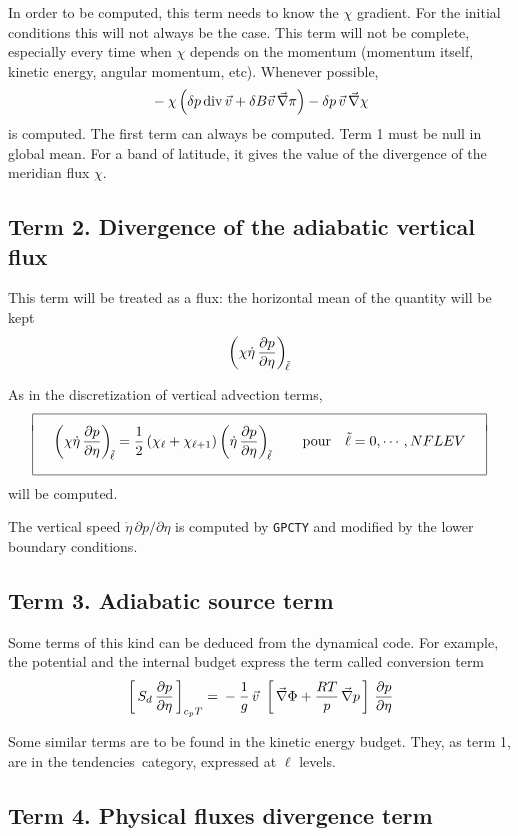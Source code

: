 In order to be computed, this term needs to know the $\chi$ gradient. For the initial conditions this will not always be the case. This term will not be complete, especially every time when $\chi$ depends on the momentum (momentum itself, kinetic energy, angular momentum, etc). Whenever possible, 
$$ \mb - \chi \lp \delta p \div \vec v + \delta B \vec v\, \grad\pi \rp - \delta p \,\vec v \,\grad 
\chi $$
is computed. The first term can always be computed.
Term 1 must be null in global mean. For a band of latitude, it gives the value of the divergence of the meridian flux $\chi$.

\subsection{Term 2. Divergence of the adiabatic vertical flux}

This term will be treated as a flux: the horizontal mean of the quantity will be kept
$$ \lp \chi \dot\eta\,\DerP p{\eta} \rp_{\!\tilde\ell} $$

\noi As in the discretization of vertical advection terms,
$$ \bay{|c|} \hline \\[-1ex]
\quad \ds \lp \chi \dot\eta\,\DerP p{\eta} \rp_{\!\tilde\ell} = \frac 12 \lp \chi_{\ell} + \chi_{\ell+1} 
\rp \lp \dot\eta\,\DerP p{\eta} \rp_{\!\tilde\ell} \qquad \mbox{pour} \quad \tilde\ell = 0, \cdots, NFLEV 
\quad \\[4ex] \hline
\eay $$
will be computed.

\noi The vertical speed $\dot\eta\,\partial p /\partial\eta$ is computed by {\tt GPCTY} and modified by the lower boundary conditions.
\subsection{Term 3. Adiabatic source term}
Some terms of this kind can be deduced from the dynamical code. For example, the potential and the internal budget express the term called conversion term
$$ \lc S_d\,\DerP p{\eta}\rd_{c_p T} = \mb - \frac 1g \, \vec v \, \lc \grad \Phi + \frac{RT}p \,\grad 
p \rc \DerP p{\eta} $$

\noi Some similar terms are to be found in the kinetic energy budget. They, as term 1, are in the \og tendencies\fg\ category, expressed at $\ell$ levels.
\subsection{Term 4. Physical fluxes divergence term	}


